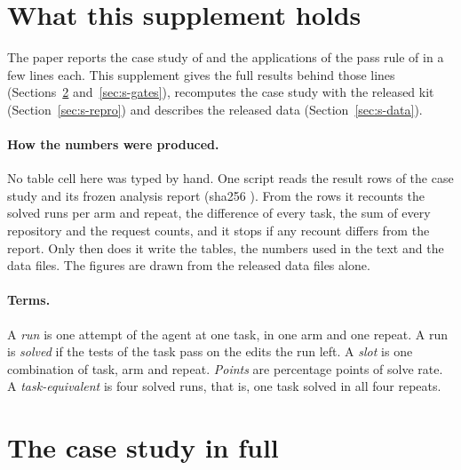 



\section{What this supplement holds}\label{sec:s-guide}

The paper reports the case study of  and the applications of the pass rule of  in a few lines
each. This supplement gives the full results behind those lines (Sections~\ref{sec:s-case} and~\ref{sec:s-gates}),
recomputes the case study with the released kit (Section~\ref{sec:s-repro}) and describes the released data
(Section~\ref{sec:s-data}).

\paragraph{How the numbers were produced.}
No table cell here was typed by hand. One script reads the result rows of the case study and its frozen analysis
report (sha256 \texttt{\expandafter\seqsplit\expandafter{\SReportSha}}). From the rows it recounts the solved runs per arm and repeat, the
difference of every task, the sum of every repository and the request counts, and it stops if any recount differs
from the report. Only then does it write the tables, the numbers used in the text and the data files. The figures are
drawn from the released data files alone.

\paragraph{Terms.}
A \emph{run} is one attempt of the agent at one task, in one arm and one repeat. A run is \emph{solved} if the tests of
the task pass on the edits the run left. A \emph{slot} is one combination of task, arm and repeat. \emph{Points} are
percentage points of solve rate. A \emph{task-equivalent} is four solved runs, that is, one task solved in all four
repeats.

\section{The case study in full}\label{sec:s-case}

